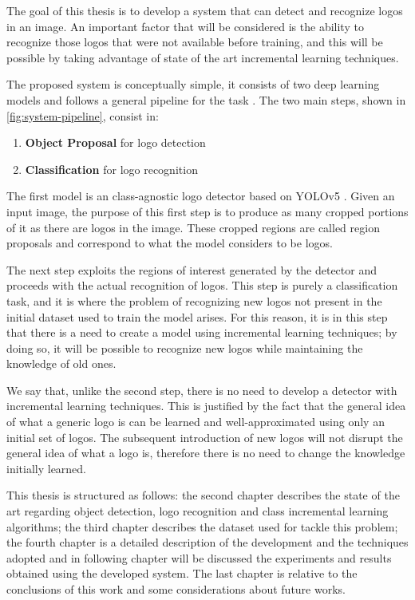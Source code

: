 The goal of this thesis is to develop a system that can detect and recognize logos in an image. An important factor that will be considered is the ability to recognize those logos that were not available before training, and this will be possible by taking advantage of state of the art incremental learning techniques.

The proposed system is conceptually simple, it consists of two deep learning models and follows a general pipeline for the task \cite{bianco2017deep}. The two main steps, shown in \autoref{fig:system-pipeline}, consist in:

\begin{enumerate}
    \item \textbf{Object Proposal} for logo detection
    \item \textbf{Classification} for logo recognition
\end{enumerate}

The first model is an class-agnostic logo detector based on YOLOv5 \cite{glenn_jocher_2021_5563715}. Given an input image, the purpose of this first step is to produce as many cropped portions of it as there are logos in the image. These cropped regions are called region proposals and correspond to what the model considers to be logos.

The next step exploits the regions of interest generated by the detector and proceeds with the actual recognition of logos. This step is purely a classification task, and it is where the problem of recognizing new logos not present in the initial dataset used to train the model arises. For this reason, it is in this step that there is a need to create a model using incremental learning techniques; by doing so, it will be possible to recognize new logos while maintaining the knowledge of old ones.

We say that, unlike the second step, there is no need to develop a detector with incremental learning techniques. This is justified by the fact that the general idea of what a generic logo is can be learned and well-approximated using only an initial set of logos. The subsequent introduction of new logos will not disrupt the general idea of what a logo is, therefore there is no need to change the knowledge initially learned.

\vspace{1.5\baselineskip}
This thesis is structured as follows: the second chapter describes the state of the art regarding object detection, logo recognition and class incremental learning algorithms; the third chapter describes the dataset used for tackle this problem; the fourth chapter is a detailed description of the development and the techniques adopted and in following chapter will be discussed the experiments and results obtained using the developed system. The last chapter is relative to the conclusions of this work and some considerations about future works.